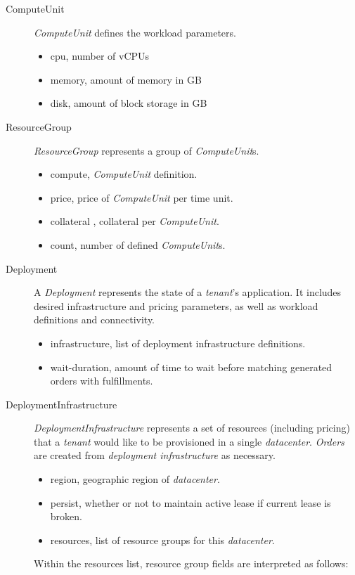 \documentclass[11pt,english]{article}
\theoremstyle{definition}
\begin{document}
\begin{description}
	\item [ComputeUnit] \textit{ComputeUnit} defines the workload parameters.
	\begin{itemize}
	\item cpu, number of vCPUs
	\item memory, amount of memory in GB
	\item disk, amount of block storage in GB
	\end{itemize}
	\item [ResourceGroup] \textit{ResourceGroup} represents a group of \textit{ComputeUnit}s.
	\begin{itemize}
		\item compute, \textit{ComputeUnit} definition.
		\item price, price of \textit{ComputeUnit} per time unit.
		\item collateral	, collateral per \textit{ComputeUnit}.
		\item count, number of defined \textit{ComputeUnit}s.
	\end{itemize}
	\item [Deployment] A \textit{Deployment} represents the state of a \textit{tenant}'s application. It includes desired infrastructure and pricing parameters, as well as workload definitions and connectivity.
	\begin{itemize}
	\item infrastructure, list of deployment infrastructure definitions.
	\item wait-duration, amount of time to wait before matching generated orders with fulfillments.
	\end{itemize}
	\item [DeploymentInfrastructure] \textit{DeploymentInfrastructure} represents a set of resources (including pricing) that a \textit{tenant} would like to be provisioned in a single \textit{datacenter}. \textit{Orders} are created from \textit{deployment infrastructure} as necessary.
	\begin{itemize}
	\item region, geographic region of \textit{datacenter}.
	\item persist, whether or not to maintain active lease if current lease is broken.
	\item resources, list of resource groups for this \textit{datacenter}.
	\end{itemize}
	Within the resources list, resource group fields are interpreted as follows:
	\begin{itemize}

\end{itemize}
\end{description}
\end{document}
